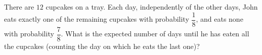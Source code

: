 There are $12$ cupcakes on a tray. Each day, independently of the other days, John eats exactly one of the remaining cupcakes with probability $\dfrac18$, and eats none with probability $\dfrac78$. What is the expected number of days until he has eaten all the cupcakes (counting the day on which he eats the last one)?
